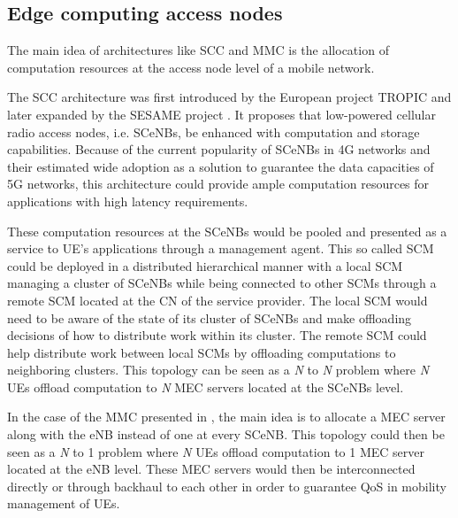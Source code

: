 \subsection{Edge computing access nodes}

\noindent The main idea of architectures like \acrfull{SCC} and \acrfull{MMC} is the allocation of computation resources at the access node level of a mobile network.

The \acrfull{SCC} architecture was first introduced by the European project TROPIC \cite{smallcellcloud} and later expanded by the SESAME project \cite{SESAM}. It proposes that low-powered cellular radio access nodes, i.e. \acrshort{SCeNBs}, be enhanced with computation and storage capabilities. Because of the current popularity of \acrshort{SCeNBs} in 4G networks and their estimated wide adoption as a solution to guarantee the data capacities of 5G networks, this architecture could provide ample computation resources for applications with high latency requirements.

These computation resources at the \acrshort{SCeNBs} would be pooled and presented as a service to \acrshort{UE}'s applications through a management agent. This so called \acrfull{SCM} could be deployed in a distributed hierarchical manner with a local \acrshort{SCM} managing a cluster of \acrshort{SCeNBs} while being connected to other \acrshort{SCM}s through a remote \acrshort{SCM} located at the \acrshort{CN} of the service provider. The local \acrshort{SCM} would need to be aware of the state of its cluster of \acrshort{SCeNBs} and make offloading decisions of how to distribute work within its cluster. The remote \acrshort{SCM} could help distribute work between local \acrshort{SCM}s by offloading computations to neighboring clusters. This topology can be seen as a \emph{N} to \emph{N} problem where \emph{N} \acrshort{UE}s offload computation to \emph{N} \acrshort{MEC} servers located at the \acrshort{SCeNBs} level.

In the case of the \acrfull{MMC} presented in \cite{mmcloud}, the main idea is to allocate a \acrshort{MEC} server along with the \acrfull{eNB} instead of one at every SCeNB. This topology could then be seen as a \emph{N} to 1 problem where \emph{N} \acrshort{UE}s offload computation to 1 \acrshort{MEC} server located at the \acrshort{eNB} level. These \acrshort{MEC} servers would then be interconnected directly or through backhaul to each other in order to guarantee \acrshort{QoS} in mobility management of \acrshort{UE}s.

